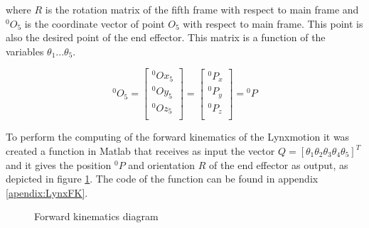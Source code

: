 \documentclass{article}
\begin{document}
where $R$ is the rotation matrix of the fifth frame with respect to main frame and ${}^0O_5$ is the coordinate vector of point $O_5$ with respect to main frame. This point is also the desired point of the end effector. This matrix is a function of the variables $\theta_1 ... \theta_5$.

\begin{equation*}
{}^0O_5 = \left[
\begin{array}{c}
	{}^0Ox_5 \\
	{}^0Oy_5 \\
	{}^0Oz_5 \\
\end{array}
\right] = \left[
\begin{array}{c}
	{}^0P_x \\
	{}^0P_y \\
	{}^0P_z \\
\end{array}
\right] = {}^0P
\end{equation*}

To perform the computing of the forward kinematics of the Lynxmotion it was created a function in Matlab that receives as input the vector $Q=[\theta_1 \theta_2 \theta_3 \theta_4 \theta_5]^T$ and it gives the position ${}^0P$ and orientation $R$ of the end effector as output, as depicted in figure \ref{fig:forward.block_diagram}. The code of the function can be found in appendix \ref{apendix:LynxFK}.

\begin{figure}
\begin{center}
\caption{Forward kinematics diagram}
\label{fig:forward.block_diagram}
\end{center}
\end{figure}
\end{document}
